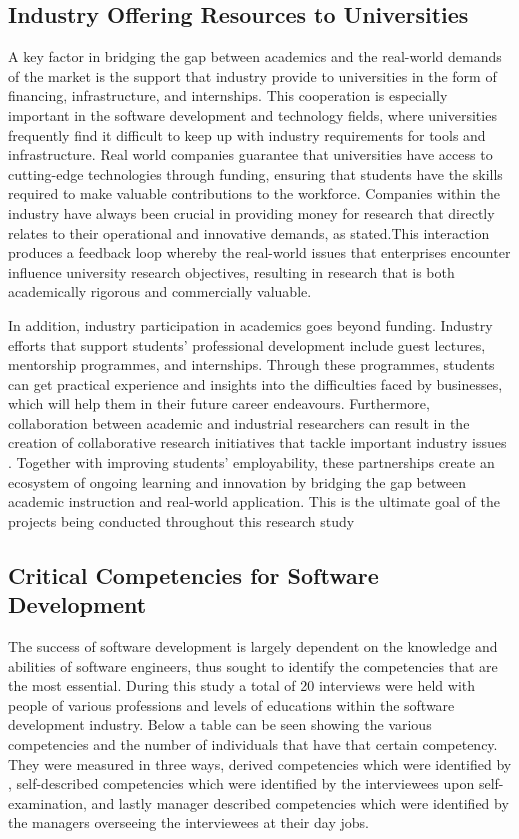 \subsection{Industry Offering Resources to Universities}
\par{A key factor in bridging the gap between academics and the real-world demands of the market is the support that industry provide to universities in the form of financing, infrastructure, and internships. This cooperation is especially important in the software development and technology fields, where universities frequently find it difficult to keep up with industry requirements for tools and infrastructure. Real world companies guarantee that universities have access to cutting-edge technologies through funding, ensuring that students have the skills required to make valuable contributions to the workforce. Companies within the industry have always been crucial in providing money for research that directly relates to their operational and innovative demands, as \cite{mowery2006universities} stated.This interaction produces a feedback loop whereby the real-world issues that enterprises encounter influence university research objectives, resulting in research that is both academically rigorous and commercially valuable.

In addition, industry participation in academics goes beyond funding. Industry efforts that support students' professional development include guest lectures, mentorship programmes, and internships. Through these programmes, students can get practical experience and insights into the difficulties faced by businesses, which will help them in their future career endeavours. Furthermore, collaboration between academic and industrial researchers can result in the creation of collaborative research initiatives that tackle important industry issues \citep{wadhwani2014future}. Together with improving students' employability, these partnerships create an ecosystem of ongoing learning and innovation by bridging the gap between academic instruction and real-world application. This is the ultimate goal of the projects being conducted throughout this research study}
\subsection{Critical Competencies for Software Development}
\par{The success of software development is largely dependent on the knowledge and abilities of software engineers, thus \cite{turley1994identifying} sought to identify the competencies that are the most essential. During this study a total of 20 interviews were held with people of various professions and levels of educations within the software development industry. Below a table can be seen showing the various competencies and the number of individuals that have that certain competency. They were measured in three ways, derived competencies which were identified by \cite{turley1994identifying}, self-described competencies which were identified by the interviewees upon self-examination, and lastly manager described competencies which were identified by the managers overseeing the interviewees at their day jobs.}

